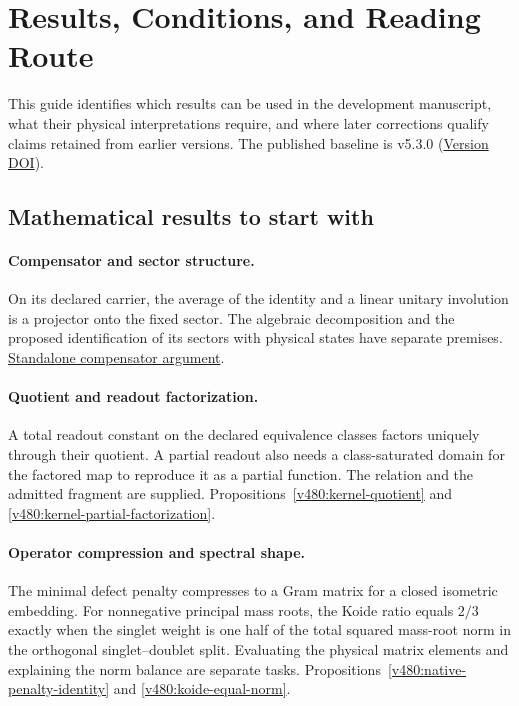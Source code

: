 \section*{Results, Conditions, and Reading Route}
\label{v480:reading-route}

This guide identifies which results can be used in the development
manuscript, what their physical interpretations require, and where later
corrections qualify claims retained from earlier versions. The published
baseline is v5.3.0
(\href{https://doi.org/10.5281/zenodo.24434403}{Version DOI}).

\subsection*{Mathematical results to start with}

\paragraph{Compensator and sector structure.}
On its declared carrier, the average of the identity and a linear unitary involution
is a projector onto the fixed sector. The algebraic decomposition
and the proposed identification of its sectors with physical states
have separate premises.
\hyperref[subsec:v480-r04-standalone-compensator]{Standalone compensator argument}.

\paragraph{Quotient and readout factorization.}
A total readout constant on the declared equivalence classes factors
uniquely through their quotient. A partial readout also needs a
class-saturated domain for the factored map to reproduce it as a partial
function. The relation and the admitted fragment are supplied.
Propositions~\ref{v480:kernel-quotient} and
\ref{v480:kernel-partial-factorization}.

\paragraph{Operator compression and spectral shape.}
The minimal defect penalty compresses to a Gram matrix for a closed
isometric embedding. For nonnegative principal mass roots, the Koide ratio equals $2/3$ exactly when the
singlet weight is one half of the total squared mass-root norm in the
orthogonal singlet--doublet split. Evaluating the physical matrix
elements and explaining the norm balance are separate tasks.
Propositions~\ref{v480:native-penalty-identity} and
\ref{v480:koide-equal-norm}.

